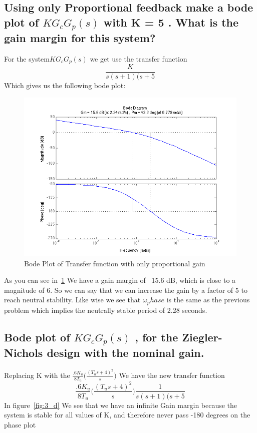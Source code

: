 \documentclass[english]{article}
\begin{document}
\subsection*{ Using only Proportional feedback  make a bode plot of $KG_cG_p(s)$ with K = 5 . What is the gain
margin for this system? }
For the system$KG_cG_p(s)$ we get use the transfer function 
$$
\frac{K}{s(s +1)(s+5}
$$
Which gives us the following bode plot:
\begin{figure}[h!]
\includegraphics[width = \linewidth]{3c2.png}
\caption{Bode Plot of Transfer function with only proportional gain }
\label{fig:3_c}
\end{figure}

As you can see in~\ref{fig:3_c} We have  a gain margin of ~15.6 dB, which is close to a magnitude of 6. So we can say that we can increase the gain by a factor of 5 to reach neutral stability. Like wise we see that $\omega_phase$ is the same as the previous problem which implies the neutrally stable period of 2.28 seconds. 
\FloatBarrier

\subsection*{ Bode plot of $KG_cG_p(s)$ , for the Ziegler-Nichols design with the nominal gain.}
Replacing K with the $\frac{.6K_u}{8T_u}\bigg( \frac{(T_us +4)^2}{s} \bigg)$
We have the new transfer function  
$$
\frac{.6K_u}{8T_u}\bigg( \frac{(T_us +4)^2}{s} \bigg) \frac{1}{s(s +1)(s+5}
$$
In figure~\ref{fig:3_d} We see that we have an infinite Gain margin because the system is stable for all values of K, and therefore never pass -180 degrees on the phase plot 
\end{document}
